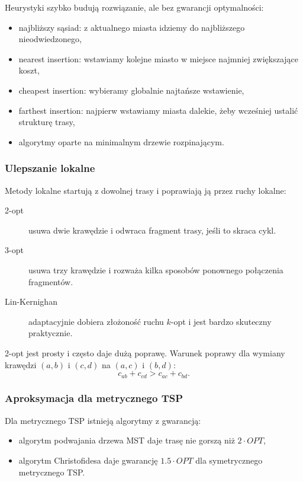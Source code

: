 Heurystyki szybko budują rozwiązanie, ale bez gwarancji optymalności:
\begin{itemize}
  \item najbliższy sąsiad: z aktualnego miasta idziemy do najbliższego nieodwiedzonego,
  \item nearest insertion: wstawiamy kolejne miasto w miejsce najmniej zwiększające koszt,
  \item cheapest insertion: wybieramy globalnie najtańsze wstawienie,
  \item farthest insertion: najpierw wstawiamy miasta dalekie, żeby wcześniej ustalić strukturę trasy,
  \item algorytmy oparte na minimalnym drzewie rozpinającym.
\end{itemize}

\subsubsection{Ulepszanie lokalne}

Metody lokalne startują z dowolnej trasy i poprawiają ją przez ruchy lokalne:
\begin{description}
  \item[2-opt] usuwa dwie krawędzie i odwraca fragment trasy, jeśli to skraca cykl.
  \item[3-opt] usuwa trzy krawędzie i rozważa kilka sposobów ponownego połączenia fragmentów.
  \item[Lin-Kernighan] adaptacyjnie dobiera złożoność ruchu $k$-opt i jest bardzo skuteczny praktycznie.
\end{description}

2-opt jest prosty i często daje dużą poprawę. Warunek poprawy dla wymiany krawędzi $(a,b)$ i $(c,d)$ na $(a,c)$ i $(b,d)$:
\[
c_{ab}+c_{cd} > c_{ac}+c_{bd}.
\]

\subsubsection{Aproksymacja dla metrycznego TSP}

Dla metrycznego TSP istnieją algorytmy z gwarancją:
\begin{itemize}
  \item algorytm podwajania drzewa MST daje trasę nie gorszą niż $2\cdot OPT$,
  \item algorytm Christofidesa daje gwarancję $1.5\cdot OPT$ dla symetrycznego metrycznego TSP.
\end{itemize}

